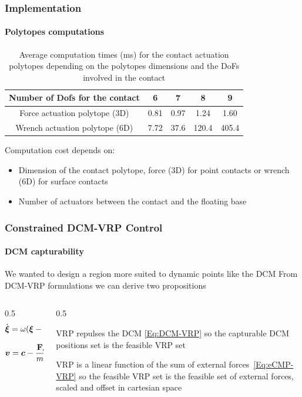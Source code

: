 \documentclass[10pt]{beamer}
\begin{document}
\begin{frame}
  \frametitle{Implementation}
  \framesubtitle{Polytopes computations}

  \begin{table}[!htb]
    \centering
    \begin{tabular}{ |c||c|c|c|c| }
      \hline
      Number of Dofs for the contact & 6 & 7 & 8 & 9 \\
      \hline
      Force actuation polytope (3D) & 0.81 & 0.97 & 1.24 & 1.60 \\
      Wrench actuation polytope (6D) & 7.72 & 37.6 & 120.4 & 405.4 \\
      \hline
    \end{tabular}
    \caption{Average computation times (ms) for the contact actuation polytopes depending on the polytopes
    dimensions and the DoFs involved in the contact}
    \label{Tab:Polytope timings}
  \end{table}
  \vfill
  Computation cost depends on:
  \begin{itemize}
    \item Dimension of the contact polytope, force (3D) for point contacts or wrench (6D) for surface contacts
    \item Number of actuators between the contact and the floating base
  \end{itemize}
\end{frame}

\begin{frame}
  \frametitle{Constrained DCM-VRP Control}
  \framesubtitle{DCM capturability}
  We wanted to design a region more suited to dynamic points like the DCM
  \vfill
  From DCM-VRP formulations we can derive two propositions
  \begin{columns}
    \begin{column}{0.5\textwidth}
      \begin{equation}
        \label{Eq:DCM-VRP}
        \dot{\boldsymbol{\xi}}=\omega(\boldsymbol{\xi}-\boldsymbol{v})
      \end{equation}

      \begin{equation}
        \label{Eq:eCMP-VRP}
        \boldsymbol{v} = \boldsymbol{c} - \frac{\mathbf{F}_\text{ext}}{m\omega^2} + {[0,0,\Delta z]}^\top
      \end{equation}
    \end{column}
    \begin{column}{0.5\textwidth}
      \begin{proposition}
        VRP repulses the DCM \eqref{Eq:DCM-VRP} so the capturable DCM positions set is the feasible VRP set
      \end{proposition}
      \begin{proposition}
        VRP is a linear function of the sum of external forces~\eqref{Eq:eCMP-VRP} so the feasible VRP set is
        the feasible set of external forces, scaled and offset in cartesian space
      \end{proposition}
    \end{column}
  \end{columns}

\end{frame}
\end{document}
